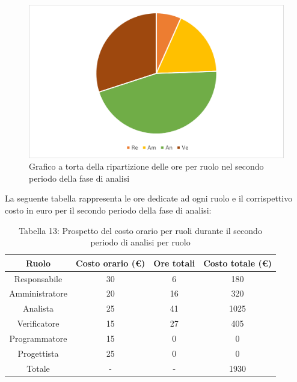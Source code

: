 \begin{figure}[H]
    \centering
    \includegraphics[scale=0.6]{img/grafi preventivo/torta/analisi/periodo2.png}
    \caption{Grafico a torta della ripartizione delle ore per ruolo nel secondo periodo della fase di analisi}
\end{figure}
La seguente tabella rappresenta le ore dedicate ad ogni ruolo e il corrispettivo costo in euro per il secondo periodo della fase di analisi:
\begin{table}[h]
	\setlength\extrarowheight{5pt}
	\centering
	\begin{tabularx}{\textwidth}{|ccc|c|}
		\hline
		\rowcolor{white}
		\textbf{Ruolo} & \textbf{Costo orario (€)} & \textbf{Ore totali} & \textbf{Costo totale (€)} \\
		\hline
		Responsabile &30&6&180 \\
		Amministratore &20&16&320 \\
		Analista &25&41&1025 \\
		Verificatore &15&27&405 \\
		Programmatore &15&0&0 \\
		Progettista &25&0&0 \\
		\hline
		Totale &-&-&1930 \\
		\hline
	\end{tabularx}
    \vspace{10pt}
	\caption{Tabella 13: Prospetto del costo orario per ruoli durante il secondo periodo di analisi per ruolo}
\end{table}
%

